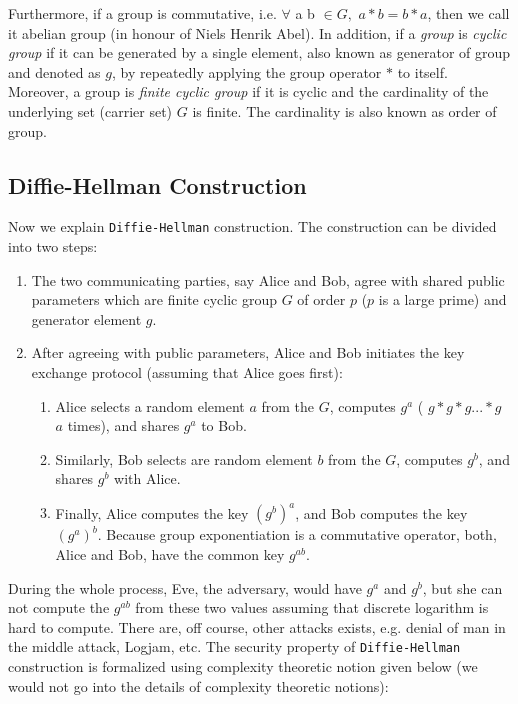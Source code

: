     \noindent
    Furthermore, if a group is commutative, i.e. 
    $\forall$ a b $\in  G,$  $a * b = b * a$, then we call it abelian group (in honour of Niels Henrik Abel). In addition, 
    if a \textit{group} is \textit{cyclic group} if it can be generated by a single element, also known as generator of group 
    and denoted as $g$, by repeatedly applying the group operator $*$ to itself. Moreover, a group is \textit{finite cyclic group}
    if it is cyclic and the cardinality of the underlying set (carrier set) $G$ is finite. The cardinality is also known as order of group. 
	    
    
     
     \subsection{Diffie-Hellman Construction}
     \label{sec:diffie-hellman}
     	Now we explain \texttt{Diffie-Hellman} construction. The construction can be divided into two steps:
		\begin{enumerate}
		\item The two communicating parties, say Alice and Bob, agree with shared public parameters which 
		are finite cyclic group $G$ of order $p$ ($p$ is a large prime) and generator element $g$.
		\item After agreeing with public parameters, Alice and Bob initiates the key exchange protocol (assuming that 
		 Alice goes first):
		 \begin{enumerate}
		   \item Alice selects a random element $a$ from the $G$, computes $g^{a}$ ( $g * g * g ... * g$  $a$ times), and shares 
		   $g^{a}$ to Bob. 
		   \item Similarly, Bob selects are random element $b$ from the $G$, computes $g^{b}$, and shares  $g^{b}$
		   with Alice.
		   \item Finally, Alice computes the key $(g^{b})^{a}$, and Bob computes the key $(g^{a})^{b}$.  Because group exponentiation is 
		   a commutative operator, both, Alice and Bob, have the common key $g^{ab}$. 
		   
		 \end{enumerate}
      \end{enumerate}		
      
     
      \noindent
       During the whole process, Eve, the adversary, would have $g^{a}$ and $g^{b}$, but she can not compute the 
      $ g^{ab}$ from these two values assuming that discrete logarithm is hard to compute. 
      There are, off course, other attacks exists, e.g. denial of man in the middle attack, Logjam, etc. 
      The security property of \texttt{Diffie-Hellman} construction is formalized using complexity theoretic notion 
      given below (we would not go into the details of complexity theoretic notions):
      
